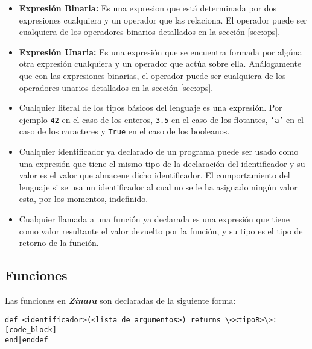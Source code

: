 \documentclass[12pt, spanish]{report}
\begin{document}
\begin{itemize}
\item \textbf{Expresi\'on Binaria:} Es una expresion que est\'a
      determinada por dos expresiones cualquiera y un operador que las
      relaciona. El operador puede ser cualquiera de los operadores
      binarios detallados en la secci\'on \ref{sec:ops}.
      
 \item \textbf{Expresi\'on Unaria:} Es una expresi\'on que se encuentra
       formada por alg\'una otra expresi\'on cualquiera y un operador que act\'ua
       sobre ella. An\'alogamente que con las expresiones binarias, el
       operador puede ser cualquiera de los operadores unarios detallados
       en la secci\'on \ref{sec:ops}.
       
 \item Cualquier literal de los tipos b\'asicos del lenguaje es una
       expresi\'on. Por ejemplo \texttt{42} en el caso de los enteros,
       \texttt{3.5} en el caso de los flotantes, \texttt{'a'} en el caso de
       los caracteres y \texttt{True} en el caso de los booleanos.
       
 \item Cualquier identificador ya declarado de un programa puede ser
       usado como una expresi\'on que tiene el mismo tipo de la declaraci\'on
       del identificador y su valor es el valor que almacene dicho
       identificador. El comportamiento del lenguaje si se usa un
       identificador al cual no se le ha asignado ning\'un valor esta,
       por los momentos, indefinido.
       
 \item Cualquier llamada a una funci\'on ya declarada es una expresi\'on
       que tiene como valor resultante el valor devuelto por la funci\'on, y
       su tipo es el tipo de retorno de la funci\'on.
\end{itemize}

\subsection{Funciones}
\label{sec:func}

Las funciones en \emph{\textbf{Zinara}} son declaradas de la siguiente
forma:

\begin{verbatim}
def <identificador>(<lista_de_argumentos>) returns \<<tipoR>\>:
[code_block]
end|enddef
\end{verbatim}
\end{document}
